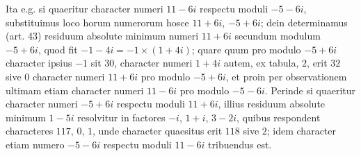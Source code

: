 \documentclass[twoside,12pt]{memoir}
\begin{document}
Ita e.g. si quaeritur character numeri \(11-6 i\) respectu moduli \(-5-6 i\), substituimus loco horum numerorum hosce \(11+6 i\), \(-5+6 i\); dein determinamus (art. 43) residuum absolute minimum numeri \(11+6 i\) secundum modulum \(-5+6 i\), quod fit \(-1-4 i=-1 \times(1+4 i)\); quare quum pro modulo \(-5+6 i\) character ipsius \(-1\) sit \(30\), character numeri \(1+4 i\) autem, ex tabula, \(2\), erit \(32\) sive \(0\) character numeri \(11+6 i\) pro modulo \(-5+6 i\), et proin per observationem ultimam etiam character numeri \(11-6 i\) pro modulo \(-5-6 i\). Perinde si quaeritur character numeri \(-5+6 i\) respectu moduli \(11+6 i\), illius residuum absolute minimum \(1-5 i\) resolvitur in factores \(-i\), \( 1+i\), \( 3-2 i\), quibus respondent characteres \(117\), \(0\), \(1\), unde character quaesitus erit \(118\) sive \(2\); idem character etiam numero \(-5-6 i\) respectu moduli \(11-6 i\) tribuendus est.
\end{document}
